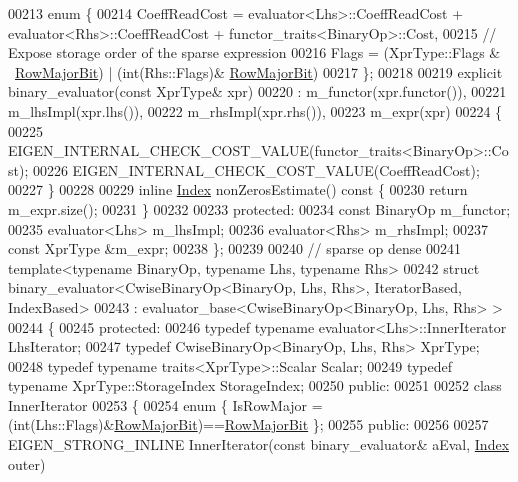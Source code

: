 \begin{DoxyCode}
00213   \textcolor{keyword}{enum} \{
00214     CoeffReadCost = evaluator<Lhs>::CoeffReadCost + evaluator<Rhs>::CoeffReadCost + 
      functor\_traits<BinaryOp>::Cost,
00215     \textcolor{comment}{// Expose storage order of the sparse expression}
00216     Flags = (XprType::Flags & ~\hyperlink{group__flags_gae4f56c2a60bbe4bd2e44c5b19cbe8762}{RowMajorBit}) | (\textcolor{keywordtype}{int}(Rhs::Flags)&
      \hyperlink{group__flags_gae4f56c2a60bbe4bd2e44c5b19cbe8762}{RowMajorBit})
00217   \};
00218 
00219   \textcolor{keyword}{explicit} binary\_evaluator(\textcolor{keyword}{const} XprType& xpr)
00220     : m\_functor(xpr.functor()),
00221       m\_lhsImpl(xpr.lhs()),
00222       m\_rhsImpl(xpr.rhs()),
00223       m\_expr(xpr)
00224   \{
00225     EIGEN\_INTERNAL\_CHECK\_COST\_VALUE(functor\_traits<BinaryOp>::Cost);
00226     EIGEN\_INTERNAL\_CHECK\_COST\_VALUE(CoeffReadCost);
00227   \}
00228 
00229   \textcolor{keyword}{inline} \hyperlink{namespace_eigen_a62e77e0933482dafde8fe197d9a2cfde}{Index} nonZerosEstimate()\textcolor{keyword}{ const }\{
00230     \textcolor{keywordflow}{return} m\_expr.size();
00231   \}
00232 
00233 \textcolor{keyword}{protected}:
00234   \textcolor{keyword}{const} BinaryOp m\_functor;
00235   evaluator<Lhs> m\_lhsImpl;
00236   evaluator<Rhs> m\_rhsImpl;
00237   \textcolor{keyword}{const} XprType &m\_expr;
00238 \};
00239 
00240 \textcolor{comment}{// sparse op dense}
00241 \textcolor{keyword}{template}<\textcolor{keyword}{typename} BinaryOp, \textcolor{keyword}{typename} Lhs, \textcolor{keyword}{typename} Rhs>
00242 \textcolor{keyword}{struct }binary\_evaluator<CwiseBinaryOp<BinaryOp, Lhs, Rhs>, IteratorBased, IndexBased>
00243   : evaluator\_base<CwiseBinaryOp<BinaryOp, Lhs, Rhs> >
00244 \{
00245 \textcolor{keyword}{protected}:
00246   \textcolor{keyword}{typedef} \textcolor{keyword}{typename} evaluator<Lhs>::InnerIterator  LhsIterator;
00247   \textcolor{keyword}{typedef} CwiseBinaryOp<BinaryOp, Lhs, Rhs> XprType;
00248   \textcolor{keyword}{typedef} \textcolor{keyword}{typename} traits<XprType>::Scalar Scalar;
00249   \textcolor{keyword}{typedef} \textcolor{keyword}{typename} XprType::StorageIndex StorageIndex;
00250 \textcolor{keyword}{public}:
00251 
00252   \textcolor{keyword}{class }InnerIterator
00253   \{
00254     \textcolor{keyword}{enum} \{ IsRowMajor = (int(Lhs::Flags)&\hyperlink{group__flags_gae4f56c2a60bbe4bd2e44c5b19cbe8762}{RowMajorBit})==\hyperlink{group__flags_gae4f56c2a60bbe4bd2e44c5b19cbe8762}{RowMajorBit} \};
00255   \textcolor{keyword}{public}:
00256 
00257     EIGEN\_STRONG\_INLINE InnerIterator(\textcolor{keyword}{const} binary\_evaluator& aEval, \hyperlink{namespace_eigen_a62e77e0933482dafde8fe197d9a2cfde}{Index} outer)

\end{DoxyCode}
